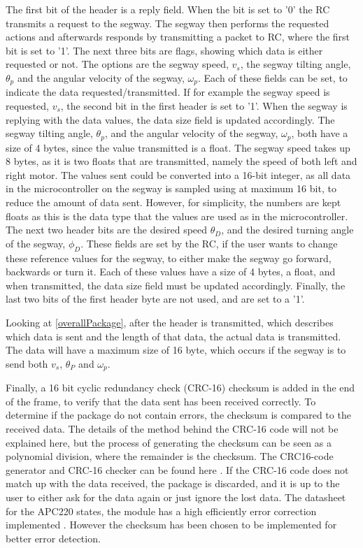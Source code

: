 The first bit of the header is a reply field. When the bit is set to '0' the RC transmits a request to the segway. The segway then performs the requested actions and afterwards responds by transmitting a packet to RC, where the first bit is set to '1'. %
The next three bits are flags, showing which data is either requested or not. The options are the segway speed, $v_s$, the segway tilting angle, $\theta_p$ and the angular velocity of the segway, $\omega_p$. Each of these fields can be set, to indicate the data requested/transmitted. If for example the segway speed is requested, $v_s$, the second bit in the first header is set to '1'.
When the segway is replying with the data values, the data size field is updated accordingly.
The segway tilting angle, $\theta_p$, and the angular velocity of the segway, $\omega_p$, both have a size of 4 bytes, since the value transmitted is a float. The segway speed takes up 8 bytes, as it is two floats that are transmitted, namely the speed of both left and right motor.
The values sent could be converted into a 16-bit integer, as all data in the microcontroller on the segway is sampled using at maximum 16 bit, to reduce the amount of data sent. However, for simplicity, the numbers are kept floats as this is the data type that the values are used as in the microcontroller.\\
The next two header bits are the desired speed $\theta_D$, and the desired turning angle of the segway, $\phi_D$. These fields are set by the RC, if the user wants to change these reference values for the segway, to either make the segway go forward, backwards or turn it. Each of these values have a size of 4 bytes, a float, and when transmitted, the data size field must be updated accordingly.
Finally, the last two bits of the first header byte are not used, and are set to a '1'.

Looking at \autoref{overallPackage}, after the header is transmitted, which describes which data is sent and the length of that data, the actual data is transmitted. The data will have a maximum size of 16 byte, which occurs if the segway is to send both $v_s$, $\theta_P$ and $\omega_p$. 

Finally, a 16 bit cyclic redundancy check (CRC-16) checksum is added in the end of the frame, to verify that the data sent has been received correctly. To determine if the package do not contain errors, the checksum is compared to the received data. The details of the method behind the CRC-16 code will not be explained here, but the process of generating the checksum can be seen as a polynomial division, where the remainder is the checksum. The CRC16-code generator and CRC-16 checker can be found here \citep{jdn}. 
If the CRC-16 code does not match up with the data received, the package is discarded, and it is up to the user to either ask for the data again or just ignore the lost data. The datasheet for the APC220 states, the module has a high efficiently error correction implemented \citep[p. 8]{APC220}. However the checksum has been chosen to be implemented for better error detection.

